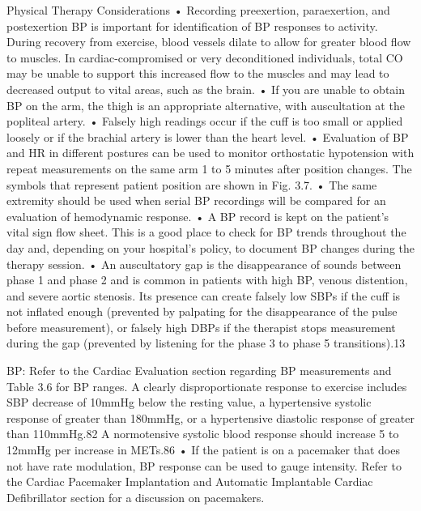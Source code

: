 Physical Therapy Considerations
•	Recording preexertion, paraexertion, and postexertion BP is important for identification of BP responses to activity. During recovery from exercise, blood vessels dilate to allow for greater blood flow to muscles. In cardiac-compromised or very deconditioned individuals, total CO may be unable to support this increased flow to the muscles and may lead to decreased output to vital areas, such as the brain.
•	If you are unable to obtain BP on the arm, the thigh is an appropriate alternative, with auscultation at the popliteal artery.
•	Falsely high readings occur if the cuff is too small or applied loosely or if the brachial artery is lower than the heart level.
•	Evaluation of BP and HR in different postures can be used to monitor orthostatic hypotension with repeat measurements on the same arm 1 to 5 minutes after position changes. The symbols that represent patient position are shown in Fig. 3.7.
•	The same extremity should be used when serial BP recordings will be compared for an evaluation of hemodynamic response.
•	A BP record is kept on the patient’s vital sign flow sheet. This is a good place to check for BP trends throughout the day and, depending on your hospital’s policy, to document BP changes during the therapy session.
•	An auscultatory gap is the disappearance of sounds between phase 1 and phase 2 and is common in patients with high BP, venous distention, and severe aortic stenosis. Its presence can create falsely low SBPs if the cuff is not inflated enough (prevented by palpating for the disappearance of the pulse before measurement), or falsely high DBPs if the therapist stops measurement during the gap (prevented by listening for the phase 3 to phase 5 transitions).13

BP: Refer to the Cardiac Evaluation section regarding BP measurements and Table 3.6 for BP ranges. A clearly disproportionate response to exercise includes SBP decrease of 10mmHg below the resting value, a hypertensive systolic response of greater than 180mmHg, or a hypertensive diastolic response of greater than 110mmHg.82 A normotensive systolic blood response should increase 5 to 12mmHg per increase in METs.86
•	If the patient is on a pacemaker that does not have rate modulation, BP response can be used to gauge intensity. Refer to the Cardiac Pacemaker Implantation and Automatic Implantable Cardiac Defibrillator section for a discussion on pacemakers.


\printbibliography[heading=subbibintoc]